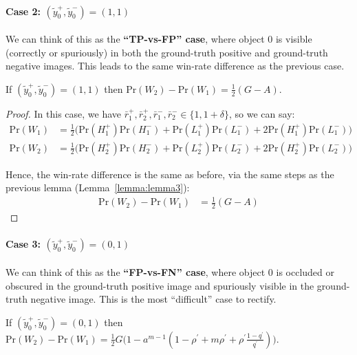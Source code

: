 \paragraph{Case 2: $(\tilde{y}_0^{+}, \tilde{y}_0^{-}) = (1,1)$} We can think of this as the \textbf{``TP-vs-FP'' case}, where object $0$ is visible (correctly or spuriously) in both the ground-truth positive and ground-truth negative images. This leads to the same win-rate difference as the previous case.

\begin{lemma}
\label{lemma:lemma4}
If $(\tilde{y}_0^{+}, \tilde{y}_0^{-}) = (1,1)$ then $\textrm{Pr}(W_2) - \textrm{Pr}(W_1) = \frac{1}{2} (G - A)$.
\end{lemma}

\begin{proof}
In this case, we have $\bar{r}_1^{+}, \bar{r}_2^{+}, \bar{r}_1^{-}, \bar{r}_2^{-} \in \{1, 1 + \delta\}$, so we can say:
\begin{align}
\textrm{Pr}(W_1) &= \frac{1}{2} \Big( \textrm{Pr}(H_1^{+}) \textrm{Pr}(H_1^{-}) + \textrm{Pr}(L_1^{+}) \textrm{Pr}(L_1^{-}) + 2 \textrm{Pr}(H_1^{+}) \textrm{Pr}(L_1^{-}) \Big)\\
\textrm{Pr}(W_2) &= \frac{1}{2} \Big( \textrm{Pr}(H_2^{+}) \textrm{Pr}(H_2^{-}) + \textrm{Pr}(L_2^{+}) \textrm{Pr}(L_2^{-}) + 2 \textrm{Pr}(H_2^{+}) \textrm{Pr}(L_2^{-}) \Big)
\end{align}

Hence, the win-rate difference is the same as before, via the same steps as the previous lemma (Lemma~\ref{lemma:lemma3}):
\begin{align}
\textrm{Pr}(W_2) - \textrm{Pr}(W_1) &= \frac{1}{2} (G - A)
\end{align}
\end{proof}

\paragraph{Case 3: $(\tilde{y}_0^{+}, \tilde{y}_0^{-}) = (0,1)$} We can think of this as the \textbf{``FP-vs-FN'' case}, where object $0$ is occluded or obscured in the ground-truth positive image and spuriously visible in the ground-truth negative image. This is the most ``difficult'' case to rectify.

\begin{lemma}
\label{lemma:lemma5}
If $(\tilde{y}_0^{+}, \tilde{y}_0^{-}) = (0,1)$ then $\textrm{Pr}(W_2) - \textrm{Pr}(W_1) = \frac{1}{2} G \Big(1 - a^{m-1}(1 - \rho^{\prime}  + m \rho^{\prime} +  \rho^{\prime} \frac{1 - q^{\prime}}{q^{\prime}})  \Big)$.
\end{lemma}

